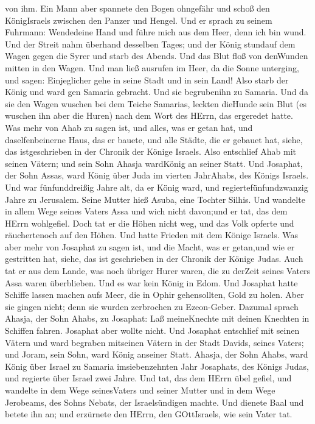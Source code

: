 von ihm.  Ein Mann aber spannete den Bogen ohngefähr und
schoß den KönigIsraels zwischen den Panzer und Hengel. Und er sprach zu
seinem Fuhrmann: Wendedeine Hand und führe mich aus dem Heer, denn ich
bin wund.  Und der Streit nahm überhand desselben Tages;
und der König stundauf dem Wagen gegen die Syrer und starb des Abends.
Und das Blut floß von denWunden mitten in den Wagen.  Und
man ließ ausrufen im Heer, da die Sonne unterging, und sagen:
Einjeglicher gehe in seine Stadt und in sein Land!  Also
starb der König und ward gen Samaria gebracht. Und sie begrubenihn zu
Samaria.  Und da sie den Wagen wuschen bei dem Teiche
Samarias, leckten dieHunde sein Blut (es wuschen ihn aber die Huren)
nach dem Wort des HErrn, das ergeredet hatte.  Was mehr von
Ahab zu sagen ist, und alles, was er getan hat, und daselfenbeinerne
Haus, das er bauete, und alle Städte, die er gebauet hat, siehe, das
istgeschrieben in der Chronik der Könige Israels.  Also
entschlief Ahab mit seinen Vätern; und sein Sohn Ahasja wardKönig an
seiner Statt.  Und Josaphat, der Sohn Assas, ward König
über Juda im vierten JahrAhabs, des Königs Israels.  Und
war fünfunddreißig Jahre alt, da er König ward, und
regiertefünfundzwanzig Jahre zu Jerusalem. Seine Mutter hieß Asuba, eine
Tochter Silhis.  Und wandelte in allem Wege seines Vaters
Assa und wich nicht davon;und er tat, das dem HErrn wohlgefiel.
 Doch tat er die Höhen nicht weg, und das Volk opferte und
räuchertenoch auf den Höhen.  Und hatte Frieden mit dem
Könige Israels.  Was aber mehr von Josaphat zu sagen ist,
und die Macht, was er getan,und wie er gestritten hat, siehe, das ist
geschrieben in der Chronik der Könige Judas.  Auch tat er
aus dem Lande, was noch übriger Hurer waren, die zu derZeit seines
Vaters Assa waren überblieben.  Und es war kein König in
Edom.  Und Josaphat hatte Schiffe lassen machen aufs Meer,
die in Ophir gehensollten, Gold zu holen. Aber sie gingen nicht; denn
sie wurden zerbrochen zu Ezeon-Geber.  Dazumal sprach
Ahasja, der Sohn Ahabs, zu Josaphat: Laß meineKnechte mit deinen
Knechten in Schiffen fahren. Josaphat aber wollte nicht. 
Und Josaphat entschlief mit seinen Vätern und ward begraben mitseinen
Vätern in der Stadt Davids, seines Vaters; und Joram, sein Sohn, ward
König anseiner Statt.  Ahasja, der Sohn Ahabs, ward König
über Israel zu Samaria imsiebenzehnten Jahr Josaphats, des Königs Judas,
und regierte über Israel zwei Jahre.  Und tat, das dem
HErrn übel gefiel, und wandelte in dem Wege seinesVaters und seiner
Mutter und in dem Wege Jerobeams, des Sohns Nebats, der Israelsündigen
machte.  Und dienete Baal und betete ihn an; und erzürnete
den HErrn, den GOttIsraels, wie sein Vater tat.

